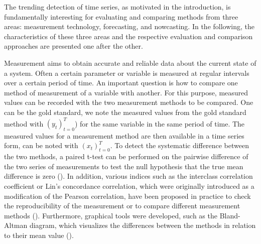 
The trending detection of time series, as motivated in the introduction, is fundamentally interesting for evaluating and comparing methods from three areas: measurement technology, forecasting, and nowcasting. In the following, the characteristics of these three areas and the respective evaluation and comparison approaches are presented one after the other.

Measurement aims to obtain accurate and reliable data about the current state of a system. Often a certain parameter or variable is measured at regular intervals over a certain period of time.
An important question is how to compare one method of measurement of a variable with another.
For this purpose, measured values can be recorded with the two measurement methods to be compared. One can be the gold standard, we note the measured values from the gold standard method with $(y_t)^T_{t=0}$) for the same variable in the same period of time. 
The measured values for a measurement method are then available in a time series form, can be noted with $(x_t)^T_{t=0}$. 
To detect the systematic difference between the two methods, a paired t-test can be performed on the pairwise difference of the two series of measurements to test the null hypothesis that the true mean difference is zero (\cite{watson2010method}).
In addition, various indices such as the interclass correlation coefficient or Lin's concordance correlation, which were originally introduced as a modification of the Pearson correlation, have been proposed in practice to check the reproducibility of the measurement or to compare different measurement methods (\cite{lawrence1989concordance,koo2016guideline,}). 
Furthermore, graphical tools were developed, such as the Bland-Altman diagram, which visualizes the differences between the methods in relation to their mean value (\cite{bland1986statistical}).

